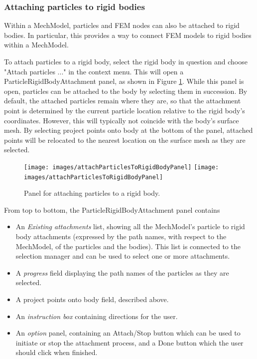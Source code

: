 \documentclass{article}
\begin{document}
\subsubsection{Attaching particles to rigid bodies}
\label{particleRigidBodyAttachSec}

Within a MechModel, particles and FEM nodes can also
be attached to rigid bodies. In particular, this provides a way
to connect FEM models to rigid bodies within a MechModel.

To attach particles to a rigid body, select the rigid body in question
and choose {\sf "Attach particles ..."} in the context menu. This will
open a ParticleRigidBodyAttachment panel, as shown in
Figure \ref{attachParticlesToRigidBodyPanelFig}. While this panel is open,
particles can be attached to the body by selecting them in succession.
By default, the attached particles remain where they are, so that the
attachment point is determined by the current particle location
relative to the rigid body's coordinates. However, this will typically
not coincide with the body's surface mesh.  By selecting {\sf project
points onto body} at the bottom of the panel, attached points will be
relocated to the nearest location on the surface mesh as they are
selected.

\begin{figure}
\begin{center}
\iflatexml
\texttt{[image: images/attachParticlesToRigidBodyPanel]}
\else
\texttt{[image: images/attachParticlesToRigidBodyPanel]}
\fi
\end{center}
\caption{Panel for attaching particles to a rigid body.}%
\label{attachParticlesToRigidBodyPanelFig}
\end{figure}

From top to bottom, the ParticleRigidBodyAttachment panel contains

\begin{itemize}

\item An {\it Existing attachments} list, showing all the MechModel's particle
to rigid body attachments (expressed by the path names, with respect
to the MechModel, of the particles and the bodies). This list is
connected to the selection manager and can be used to select one or
more attachments.

\item A {\it progress} field displaying the path names of the particles as
they are selected.

\item A {\sf project points onto body} field, described above.

\item An {\it instruction box} containing directions for the user.

\item An {\it option} panel, containing an {\sf Attach/Stop} button 
which can be used
to initiate or stop the attachment process, and a {\sf Done} button which
the user should click when finished.

\end{itemize}
\end{document}
